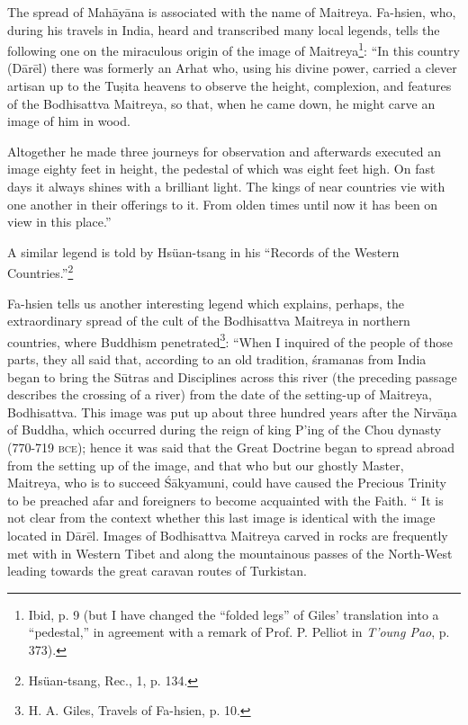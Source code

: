 \documentclass[a4paper, 12pt, oneside]{article}
\begin{document}
The spread of Mah\={a}y\={a}na is associated with the name of Maitreya. Fa-hsien, who, during his travels in India, heard and transcribed many local legends, tells the following one on the miraculous origin of the image of Maitreya\footnote{Ibid, p. 9 (but I have changed the ``folded legs'' of Giles' translation into a ``pedestal,'' in agreement with a remark of Prof. P. Pelliot in \emph{T'oung Pao}, p. 373).}: ``In this country (D\={a}r\={e}l) there was formerly an Arhat who, using his divine power, carried a clever artisan up to the Tu\d{s}ita heavens to observe the height, complexion, and features of the Bodhisattva Maitreya, so that, when he came down, he might carve an image of him in wood.

Altogether he made three journeys for observation and afterwards executed an image eighty feet in height, the pedestal of which was eight feet high. On fast days it always shines with a brilliant light. The kings of near countries vie with one another in their offerings to it. From olden times until now it has been on view in this place.''

A similar legend is told by Hsüan-tsang in his ``Records of the Western Countries.''\footnote{Hsüan-tsang, Rec., 1, p. 134.}

Fa-hsien tells us another interesting legend which explains, perhaps, the extraordinary spread of the cult of the Bodhisattva Maitreya in northern countries, where Buddhism penetrated\footnote{H. A. Giles, Travels of Fa-hsien, p. 10.}: ``When I inquired of the people of those parts, they all said that, according to an old tradition, \'{s}ramanas from India began to bring the S\={u}tras and Disciplines across this river (the preceding passage describes the crossing of a river) from the date of the setting-up of Maitreya, Bodhisattva. This image was put up about three hundred years after the Nirv\={a}\d{n}a of Buddha, which occurred during the reign of king P'ing of the Chou dynasty (770-719 \textsc{bce}); hence it was said that the Great Doctrine began to spread abroad from the setting up of the image, and that who but our ghostly Master, Maitreya, who is to succeed \'{S}\={a}kyamuni, could have caused the Precious Trinity to be preached afar and foreigners to become acquainted with the Faith. `` It is not clear from the context whether this last image is identical with the image located in D\={a}r\={e}l. Images of Bodhisattva Maitreya carved in rocks are frequently met with in Western Tibet and along the mountainous passes of the North-West leading towards the great caravan routes of Turkistan.
\end{document}
